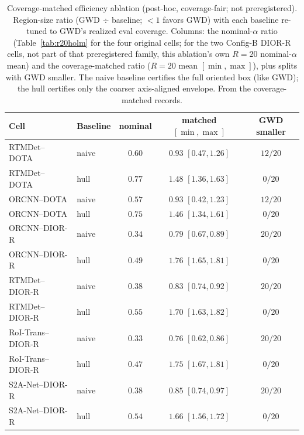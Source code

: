 \documentclass[11pt]{article}
\begin{document}
\begin{table}[t]\centering\small
\caption{Coverage-matched efficiency ablation (post-hoc, coverage-fair; not preregistered).
Region-size ratio (GWD $\div$ baseline; ${<}1$ favors GWD) with each baseline re-tuned to GWD's realized
eval coverage. Columns: the nominal-$\alpha$ ratio (Table~\ref{tab:r20holm} for the four original cells; for
the two Config-B DIOR-R cells, not part of that preregistered family, this ablation's own $R{=}20$
nominal-$\alpha$ mean) and the coverage-matched ratio
($R{=}20$ mean $[\min,\max]$), plus splits with GWD smaller. The naive baseline certifies the full oriented
box (like GWD); the hull certifies only the coarser axis-aligned envelope. From the coverage-matched
records.}
\label{tab:covmatched}
\begin{tabular}{llccc}
\toprule
Cell & Baseline & nominal & matched $[\min,\max]$ & GWD smaller \\
\midrule
RTMDet--DOTA   & naive & $0.60$ & $0.93$ $[0.47,1.26]$ & $12/20$ \\
RTMDet--DOTA   & hull  & $0.77$ & $1.48$ $[1.36,1.63]$ & $0/20$ \\
ORCNN--DOTA    & naive & $0.57$ & $0.93$ $[0.42,1.23]$ & $12/20$ \\
ORCNN--DOTA    & hull  & $0.75$ & $1.46$ $[1.34,1.61]$ & $0/20$ \\
ORCNN--DIOR-R  & naive & $0.34$ & $0.79$ $[0.67,0.89]$ & $20/20$ \\
ORCNN--DIOR-R  & hull  & $0.49$ & $1.76$ $[1.65,1.81]$ & $0/20$ \\
RTMDet--DIOR-R & naive & $0.38$ & $0.83$ $[0.74,0.92]$ & $20/20$ \\
RTMDet--DIOR-R & hull  & $0.55$ & $1.70$ $[1.63,1.82]$ & $0/20$ \\
RoI-Trans--DIOR-R & naive & $0.33$ & $0.76$ $[0.62,0.86]$ & $20/20$ \\
RoI-Trans--DIOR-R & hull  & $0.47$ & $1.75$ $[1.67,1.81]$ & $0/20$ \\
S2A-Net--DIOR-R   & naive & $0.38$ & $0.85$ $[0.74,0.97]$ & $20/20$ \\
S2A-Net--DIOR-R   & hull  & $0.54$ & $1.66$ $[1.56,1.72]$ & $0/20$ \\
\bottomrule
\end{tabular}
\end{table}
\end{document}
